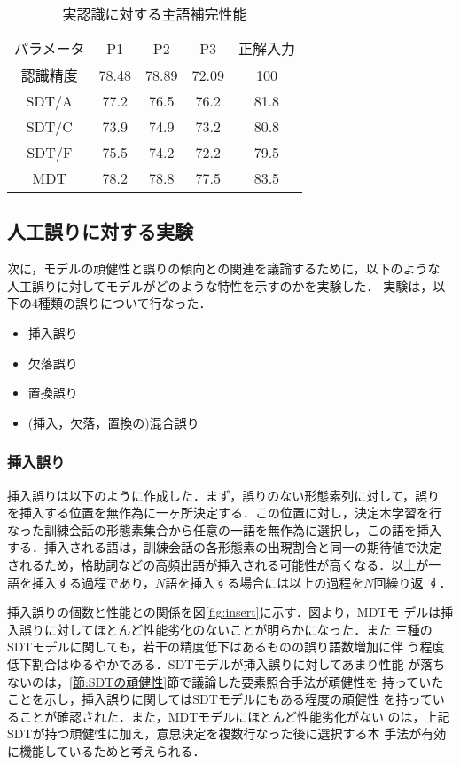 \begin{table}
\begin{center}
\caption{実認識に対する主語補完性能}
\label{表:実誤り}
\begin{tabular}{c|ccc|c}
\hline\hline
パラメータ &  P1  & P2  & P3 & 正解入力 \\
認識精度   & 78.48 & 78.89 & 72.09 & 100 \\
\hline
SDT/A & 77.2 & 76.5 & 76.2 & 81.8 \\
SDT/C & 73.9 & 74.9 & 73.2 & 80.8 \\
SDT/F & 75.5 & 74.2 & 72.2 & 79.5 \\
\hline
 MDT  & 78.2 & 78.8 & 77.5 & 83.5 \\
\hline
\end{tabular}
\end{center}
\end{table}



\subsection{人工誤りに対する実験}

次に，モデルの頑健性と誤りの傾向との関連を議論するために，以下のような
人工誤りに対してモデルがどのような特性を示すのかを実験した．
実験は，以下の4種類の誤りについて行なった．

\begin{itemize}
\item 挿入誤り
\item 欠落誤り
\item 置換誤り
\item (挿入，欠落，置換の)混合誤り
\end{itemize}


\subsubsection{挿入誤り}

挿入誤りは以下のように作成した．まず，誤りのない形態素列に対して，誤り
を挿入する位置を無作為に一ヶ所決定する．この位置に対し，決定木学習を行
なった訓練会話の形態素集合から任意の一語を無作為に選択し，この語を挿入
する．挿入される語は，訓練会話の各形態素の出現割合と同一の期待値で決定
されるため，格助詞などの高頻出語が挿入される可能性が高くなる．以上が一
語を挿入する過程であり，$N$語を挿入する場合には以上の過程を$N$回繰り返
す．

挿入誤りの個数と性能との関係を図\ref{fig:insert}に示す．図より，MDTモ
デルは挿入誤りに対してほとんど性能劣化のないことが明らかになった．また
三種のSDTモデルに関しても，若干の精度低下はあるものの誤り語数増加に伴
う程度低下割合はゆるやかである．SDTモデルが挿入誤りに対してあまり性能
が落ちないのは，\ref{節:SDTの頑健性}節で議論した要素照合手法が頑健性を
持っていたことを示し，挿入誤りに関してはSDTモデルにもある程度の頑健性
を持っていることが確認された．また，MDTモデルにほとんど性能劣化がない
のは，上記SDTが持つ頑健性に加え，意思決定を複数行なった後に選択する本
手法が有効に機能しているためと考えられる．


